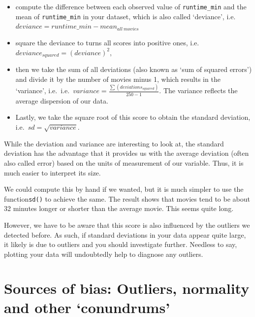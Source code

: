 \documentclass[
]{book}
\newenvironment{Shaded}{\begin{snugshade}}{\end{snugshade}}
\newcommand{\DocumentationTok}[1]{\textcolor[rgb]{0.56,0.35,0.01}{\textbf{\textit{#1}}}}
\newcommand{\FunctionTok}[1]{\textcolor[rgb]{0.00,0.00,0.00}{#1}}
\newcommand{\NormalTok}[1]{#1}
\newcommand{\SpecialCharTok}[1]{\textcolor[rgb]{0.00,0.00,0.00}{#1}}
\begin{document}
\begin{itemize}
\item
  compute the difference between each observed value of \texttt{runtime\_min} and the mean of \texttt{runtime\_min} in your dataset, which is also called `deviance', i.e.~\(deviance = runtime\_min - mean_{all\ movies}\)
\item
  square the deviance to turns all scores into positive ones, i.e.~\(deviance_{squared} = (deviance)^2\),
\item
  then we take the sum of all deviations (also known as `sum of squared errors') and divide it by the number of movies minus 1, which results in the `variance', i.e.~i.e.~\(variance = \frac{\sum(deviations_{squared})}{250-1}\). The variance reflects the average dispersion of our data.
\item
  Lastly, we take the square root of this score to obtain the standard deviation, i.e.~\(sd = \sqrt{variance}\).
\end{itemize}

While the deviation and variance are interesting to look at, the standard deviation has the advantage that it provides us with the average deviation (often also called error) based on the units of measurement of our variable. Thus, it is much easier to interpret its size.

We could compute this by hand if we wanted, but it is much simpler to use the function\texttt{sd()} to achieve the same. The result shows that movies tend to be about 32 minutes longer or shorter than the average movie. This seems quite long.

\begin{Shaded}
\end{Shaded}

However, we have to be aware that this score is also influenced by the outliers we detected before. As such, if standard deviations in your data appear quite large, it likely is due to outliers and you should investigate further. Needless to say, plotting your data will undoubtedly help to diagnose any outliers.

\hypertarget{sources-of-bias}{%
\chapter{Sources of bias: Outliers, normality and other `conundrums'}\label{sources-of-bias}}
\end{document}
